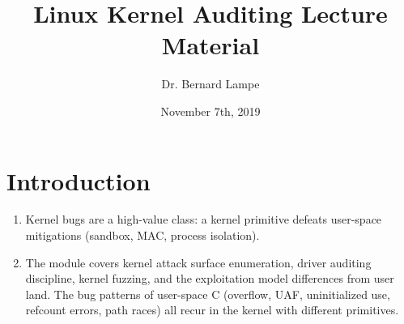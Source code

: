 \documentclass[12pt]{Training}
\title{Linux Kernel Auditing Lecture Material}
\author{Dr. Bernard Lampe}
\date{November 7th, 2019}
\begin{document}
\maketitle

\section*{Introduction}
\begin{enumerate}
    \item Kernel bugs are a high-value class: a kernel primitive defeats user-space mitigations (sandbox, MAC, process isolation).
    \item The module covers kernel attack surface enumeration, driver auditing discipline, kernel fuzzing, and the exploitation model differences from user land. The bug patterns of user-space C (overflow, UAF, uninitialized use, refcount errors, path races) all recur in the kernel with different primitives.
\end{enumerate}
\end{document}
